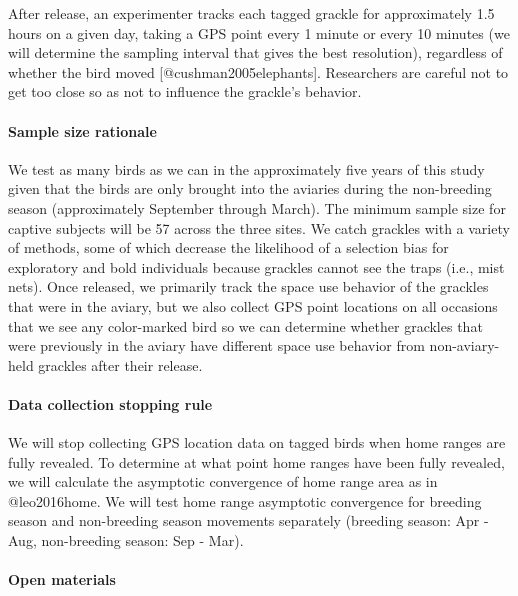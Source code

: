 \documentclass[]{article}
\let\oldparagraph\paragraph
\renewcommand{\paragraph}[1]{\oldparagraph{#1}\mbox{}}
\begin{document}
After release, an experimenter tracks each tagged grackle for
approximately 1.5 hours on a given day, taking a GPS point every 1
minute or every 10 minutes (we will determine the sampling interval that
gives the best resolution), regardless of whether the bird moved
{[}@cushman2005elephants{]}. Researchers are careful not to get too
close so as not to influence the grackle's behavior.

\paragraph{\texorpdfstring{\textbf{Sample size
rationale}}{Sample size rationale}}\label{sample-size-rationale}

We test as many birds as we can in the approximately five years of this
study given that the birds are only brought into the aviaries during the
non-breeding season (approximately September through March). The minimum
sample size for captive subjects will be 57 across the three sites. We
catch grackles with a variety of methods, some of which decrease the
likelihood of a selection bias for exploratory and bold individuals
because grackles cannot see the traps (i.e., mist nets). Once released,
we primarily track the space use behavior of the grackles that were in
the aviary, but we also collect GPS point locations on all occasions
that we see any color-marked bird so we can determine whether grackles
that were previously in the aviary have different space use behavior
from non-aviary-held grackles after their release.

\paragraph{\texorpdfstring{\textbf{Data collection stopping
rule}}{Data collection stopping rule}}\label{data-collection-stopping-rule}

We will stop collecting GPS location data on tagged birds when home
ranges are fully revealed. To determine at what point home ranges have
been fully revealed, we will calculate the asymptotic convergence of
home range area as in @leo2016home. We will test home range asymptotic
convergence for breeding season and non-breeding season movements
separately (breeding season: Apr - Aug, non-breeding season: Sep - Mar).

\paragraph{\texorpdfstring{\textbf{Open
materials}}{Open materials}}\label{open-materials}
\end{document}
